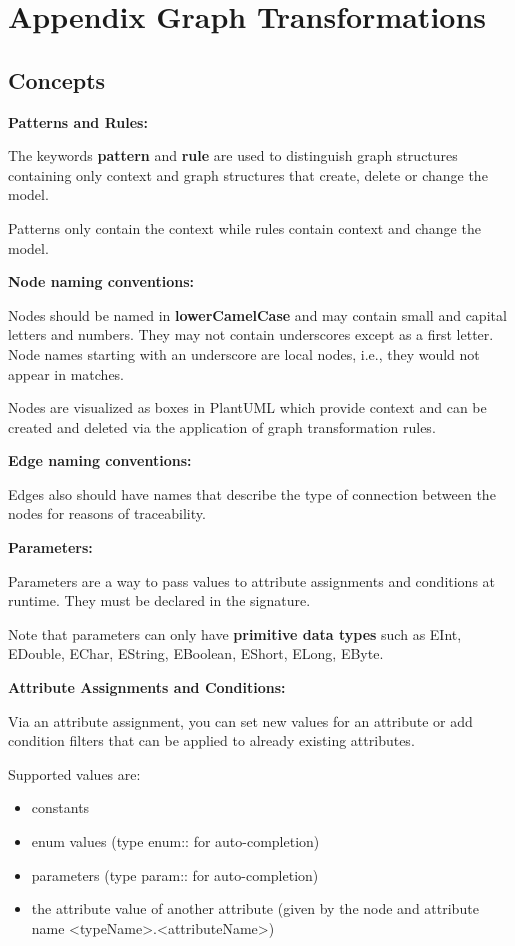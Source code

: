 \section{Appendix Graph Transformations}

\subsection{Concepts}

\textbf{Patterns and Rules:}

The keywords \textbf{pattern} and \textbf{rule} are used to distinguish graph structures containing only context and graph structures that create, delete or change the model.

Patterns only contain the context while rules contain context and change the model.\newline

\textbf{Node naming conventions:}

Nodes should be named in \textbf{lowerCamelCase} and may contain small and capital letters and numbers. They may not contain underscores except as a first letter. Node names starting with an underscore are local nodes, i.e., they would not appear in matches.

Nodes are visualized as boxes in PlantUML which provide context and can be created and deleted via the application of graph transformation rules.\newline

\textbf{Edge naming conventions:}

Edges also should have names that describe the type of connection between the nodes for reasons of traceability.\newline

\textbf{Parameters:}

Parameters are a way to pass values to attribute assignments and conditions at runtime. They must be declared in the signature.

Note that parameters can only have \textbf{primitive data types} such as EInt, EDouble, EChar, EString, EBoolean, EShort, ELong, EByte.\newline

\textbf{Attribute Assignments and Conditions:}

Via an attribute assignment, you can set new values for an attribute or add condition filters that can be applied to already existing attributes.

Supported values are:
\begin{itemize}

\item constants 
\item enum values (type enum:: for auto-completion)
\item parameters (type param:: for auto-completion)
\item the attribute value of another attribute \newline (given by the node and attribute name <typeName>.<attributeName>)

\end{itemize}

